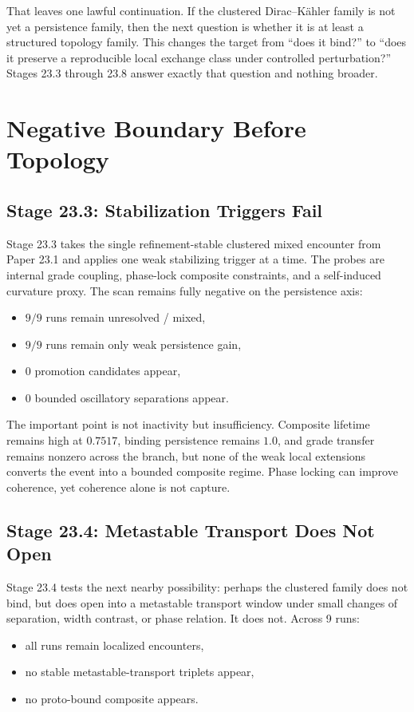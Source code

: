 \documentclass[11pt]{article}
\begin{document}
That leaves one lawful continuation. If the clustered Dirac--K\"ahler family is not yet a persistence family, then the next question is whether it is at least a structured topology family. This changes the target from ``does it bind?'' to ``does it preserve a reproducible local exchange class under controlled perturbation?'' Stages 23.3 through 23.8 answer exactly that question and nothing broader.

\section{Negative Boundary Before Topology}

\subsection{Stage 23.3: Stabilization Triggers Fail}

Stage 23.3 takes the single refinement-stable clustered mixed encounter from Paper 23.1 and applies one weak stabilizing trigger at a time. The probes are internal grade coupling, phase-lock composite constraints, and a self-induced curvature proxy. The scan remains fully negative on the persistence axis:
\begin{itemize}
\item $9/9$ runs remain unresolved / mixed,
\item $9/9$ runs remain only weak persistence gain,
\item $0$ promotion candidates appear,
\item $0$ bounded oscillatory separations appear.
\end{itemize}

The important point is not inactivity but insufficiency. Composite lifetime remains high at $0.7517$, binding persistence remains $1.0$, and grade transfer remains nonzero across the branch, but none of the weak local extensions converts the event into a bounded composite regime. Phase locking can improve coherence, yet coherence alone is not capture.

\subsection{Stage 23.4: Metastable Transport Does Not Open}

Stage 23.4 tests the next nearby possibility: perhaps the clustered family does not bind, but does open into a metastable transport window under small changes of separation, width contrast, or phase relation. It does not. Across 9 runs:
\begin{itemize}
\item all runs remain localized encounters,
\item no stable metastable-transport triplets appear,
\item no proto-bound composite appears.
\end{itemize}
\end{document}
